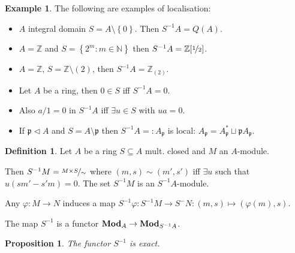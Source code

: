 \documentclass{article}
\newcommand{\N}{\mathbb{N}}
\newcommand{\Z}{\mathbb{Z}}
\DeclareMathOperator{\modules}{{\bf Mod}}
\newcommand{\set}[1]{\left\{#1\right\}}
\newcommand{\setwith}[2]{\left\{#1:#2\right\}}
\newcommand{\primeid}{\mathfrak{p}}
\newcommand{\ideal}{\triangleleft}
\newtheorem{proposition}[theorem]{Proposition}
\theoremstyle{definition}
\newtheorem{definition}[theorem]{Definition}
\newtheorem{example}[theorem]{Example}
\begin{document}
\begin{example}
    The following are examples of localisation:
    \begin{itemize}
        \item \(A\) integral domain \(S=A\setminus\set{0}\). Then
              \(S^{-1}A=Q(A)\).

        \item \(A=\Z\) and \(S=\setwith{2^{m}}{m\in\N}\) then
              \(S^{-1}A=\Z[\nicefrac{1}{2}]\).

        \item \(A=\Z\), \(S=\Z\setminus(2)\), then \(S^{-1}A=\Z_{(2)}\).

        \item Let \(A\) be a ring, then \(0\in S\) iff \(S^{-1}A=0\).

        \item Also \(a/1=0\) in \(S^{-1}A\) iff \(\exists u\in S\) with
              \(ua=0\).

        \item If \(\primeid\ideal A\) and \(S=A\setminus\primeid\) then
              \(S^{-1}A=:A_{\primeid}\) is local:
              \(A_{\primeid}=A_{\primeid}^{*}\sqcup \primeid A_{\primeid}\).
    \end{itemize}
\end{example}

\begin{definition}
    Let \(A\) be a ring \(S\subseteq A\) mult. closed and \(M\) an \(A\)-module.

    Then \(S^{-1}M=\nicefrac{M\times S}{\sim}\) where \((m,s)\sim(m',s')\) iff
    \(\exists u\) such that \(u(sm'-s'm)=0\). The set \(S^{-1}M\) is an
    \(S^{-1}A\)-module.

    Any \(\varphi:M\to N\) induces a map \(S^{-1}\varphi:S^{-1}M\to
    S^{-}N:(m,s)\mapsto (\varphi(m),s)\).

    The map \(S^{-1}\) is a functor \(\modules_{A}\to \modules_{S^{-1}A}\).
\end{definition}

\begin{proposition}
    The functor \(S^{-1}\) is exact.
\end{proposition}
\end{document}
